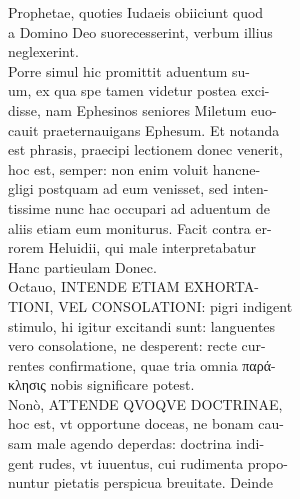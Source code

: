 \documentclass{article}
\begin{document}
\begin{pages}
                Prophetae, quoties Iudaeis obiiciunt quod \\
                a Domino Deo suorecesserint, verbum illius \\
                neglexerint. \\
                Porre simul hic promittit aduentum su- \\
                um, ex qua spe tamen videtur postea exci- \\
                disse, nam Ephesinos seniores Miletum euo- \\
                cauit praeternauigans Ephesum. Et notanda \\
                est phrasis, praecipi lectionem donec venerit, \\
                hoc est, semper: non enim voluit hancne- \\
                gligi postquam ad eum venisset, sed inten- \\
                tissime nunc hac occupari ad aduentum de \\
                aliis etiam eum moniturus. Facit contra er- \\
                rorem Heluidii, qui male interpretabatur \\
                Hanc partieulam Donec. \\
                Octauo, INTENDE ETIAM EXHORTA- \\
                TIONI, VEL CONSOLATIONI: pigri indigent \\
                stimulo, hi igitur excitandi sunt: languentes \\
                vero consolatione, ne desperent: recte cur- \\
                rentes confirmatione, quae tria omnia παρά- \\
                κλησις nobis significare potest. \\
                Nonò, ATTENDE QVOQVE DOCTRINAE, \\
                hoc est, vt opportune doceas, ne bonam cau- \\
                sam male agendo deperdas: doctrina indi- \\
                gent rudes, vt iuuentus, cui rudimenta propo- \\
                nuntur pietatis perspicua breuitate. Deinde \\
\end{pages}
\end{document}
